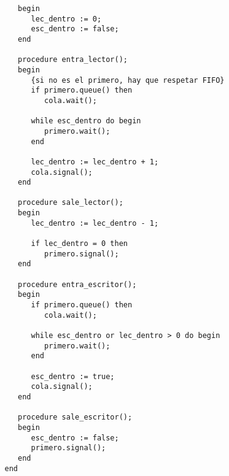 \begin{ejercicio}
\begin{enumerate}
\begin{verbatim}
                   begin
                      lec_dentro := 0;
                      esc_dentro := false;
                   end

                   procedure entra_lector();
                   begin
                      {si no es el primero, hay que respetar FIFO}
                      if primero.queue() then 
                         cola.wait();

                      while esc_dentro do begin
                         primero.wait();
                      end

                      lec_dentro := lec_dentro + 1;
                      cola.signal();
                   end

                   procedure sale_lector();
                   begin
                      lec_dentro := lec_dentro - 1;

                      if lec_dentro = 0 then
                         primero.signal();
                   end

                   procedure entra_escritor();
                   begin
                      if primero.queue() then
                         cola.wait();

                      while esc_dentro or lec_dentro > 0 do begin
                         primero.wait();
                      end

                      esc_dentro := true;
                      cola.signal();
                   end

                   procedure sale_escritor();
                   begin
                      esc_dentro := false;
                      primero.signal();
                   end
                end
            \end{verbatim}
    \end{enumerate}
\end{ejercicio}


